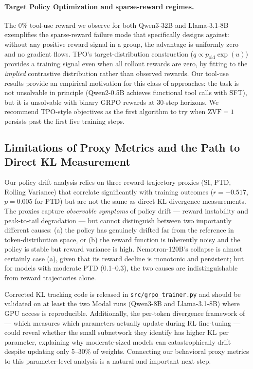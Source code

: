 \documentclass{article}
\begin{document}
\paragraph{Target Policy Optimization and sparse-reward regimes.}
The 0\% tool-use reward we observe for both Qwen3-32B and Llama-3.1-8B
exemplifies the sparse-reward failure mode that \citet{kaddour2026tpo}
specifically designs against: without any positive reward signal in a group,
the advantage is uniformly zero and no gradient flows.
TPO's target-distribution construction ($q \propto p_\text{old} \exp(u)$)
provides a training signal even when all rollout rewards are zero, by fitting
to the \emph{implied} contrastive distribution rather than observed rewards.
Our tool-use results provide an empirical motivation for this class of
approaches: the task is not unsolvable in principle (Qwen2-0.5B achieves
functional tool calls with SFT), but it is unsolvable with binary GRPO
rewards at 30-step horizons.
We recommend TPO-style objectives as the first algorithm to try when
$\text{ZVF} = 1$ persists past the first five training steps.

\subsection{Limitations of Proxy Metrics and the Path to Direct KL Measurement}
\label{sec:discuss_kl}

Our policy drift analysis relies on three reward-trajectory proxies (SI, PTD,
Rolling Variance) that correlate significantly with training outcomes
($r = -0.517$, $p = 0.005$ for PTD) but are not the same as direct KL
divergence measurements.
The proxies capture \emph{observable symptoms} of policy drift --- reward
instability and peak-to-tail degradation --- but cannot distinguish between
two importantly different causes: (a) the policy has genuinely drifted far from
the reference in token-distribution space, or (b) the reward function is
inherently noisy and the policy is stable but reward variance is high.
Nemotron-120B's collapse is almost certainly case (a), given that its reward
decline is monotonic and persistent; but for models with moderate PTD (0.1--0.3),
the two causes are indistinguishable from reward trajectories alone.

Corrected KL tracking code is released in \texttt{src/grpo\_trainer.py} and
should be validated on at least the two Modal runs (Qwen3-8B and
Llama-3.1-8B) where GPU access is reproducible.
Additionally, the per-token divergence framework of \citet{liu2025rlsubnetworks}
--- which measures which parameters actually update during RL fine-tuning ---
could reveal whether the small subnetwork they identify has higher KL per
parameter, explaining why moderate-sized models can catastrophically drift
despite updating only 5--30\% of weights.
Connecting our behavioral proxy metrics to this parameter-level analysis is a
natural and important next step.
\end{document}
